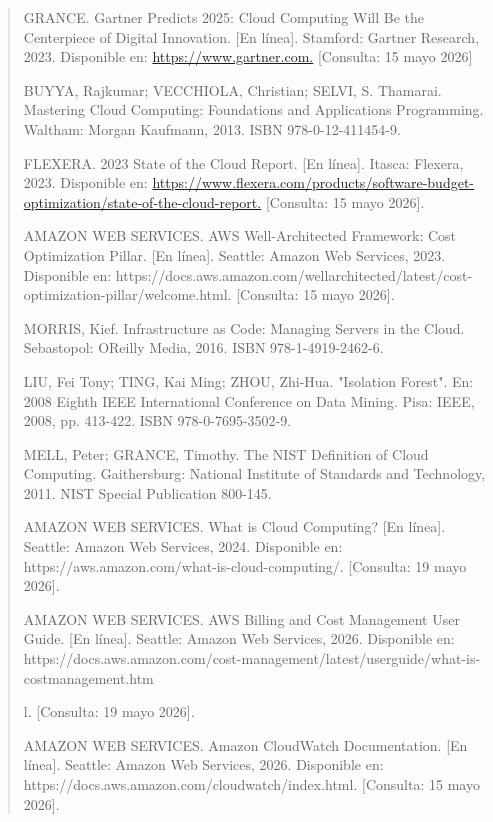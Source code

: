 \documentclass[
]{article}
\begin{document}
\begin{quote}
GRANCE. Gartner Predicts 2025: Cloud Computing Will Be the Centerpiece
of Digital Innovation. {[}En línea{]}. Stamford: Gartner Research, 2023.
Disponible en: \href{http://www.gartner.com/}{https://www.gartner.com.}
{[}Consulta: 15 mayo 2026{]}

BUYYA, Rajkumar; VECCHIOLA, Christian; SELVI, S. Thamarai. Mastering
Cloud Computing: Foundations and Applications Programming. Waltham:
Morgan Kaufmann, 2013. ISBN 978-0-12-411454-9.

FLEXERA. 2023 State of the Cloud Report. {[}En línea{]}. Itasca:
Flexera, 2023. Disponible en:
\href{http://www.flexera.com/products/software-budget-optimization/state-of-the-cloud-report}{https://www.flexera.com/products/software-budget-optimization/state-of-the-cloud-report.}
{[}Consulta: 15 mayo 2026{]}.

AMAZON WEB SERVICES. AWS Well-Architected Framework: Cost Optimization
Pillar. {[}En línea{]}. Seattle: Amazon Web Services, 2023. Disponible
en:
https://docs.aws.amazon.com/wellarchitected/latest/cost-optimization-pillar/welcome.html.
{[}Consulta: 15 mayo 2026{]}.

MORRIS, Kief. Infrastructure as Code: Managing Servers in the Cloud.
Sebastopol: O\textquotesingle Reilly Media, 2016. ISBN
978-1-4919-2462-6.

LIU, Fei Tony; TING, Kai Ming; ZHOU, Zhi-Hua. "Isolation Forest". En:
2008 Eighth IEEE International Conference on Data Mining. Pisa: IEEE,
2008, pp. 413-422. ISBN 978-0-7695-3502-9.

MELL, Peter; GRANCE, Timothy. The NIST Definition of Cloud Computing.
Gaithersburg: National Institute of Standards and Technology, 2011. NIST
Special Publication 800-145.

AMAZON WEB SERVICES. What is Cloud Computing? {[}En línea{]}. Seattle:
Amazon Web Services, 2024. Disponible en:
https://aws.amazon.com/what-is-cloud-computing/. {[}Consulta: 19 mayo
2026{]}.

AMAZON WEB SERVICES. AWS Billing and Cost Management User Guide. {[}En
línea{]}. Seattle: Amazon Web Services, 2026. Disponible en:
https://docs.aws.amazon.com/cost-management/latest/userguide/what-is-costmanagement.htm

l. {[}Consulta: 19 mayo 2026{]}.

AMAZON WEB SERVICES. Amazon CloudWatch Documentation. {[}En línea{]}.
Seattle: Amazon Web Services, 2026. Disponible en:
https://docs.aws.amazon.com/cloudwatch/index.html. {[}Consulta: 15 mayo
2026{]}.


\end{quote}
\end{document}
